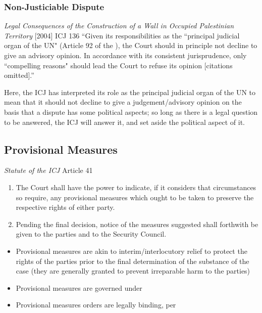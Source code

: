 \subsubsection{Non-Justiciable Dispute}
\begin{casedetails}{\textit{Legal Consequences of the Construction of a Wall in Occupied Palestinian Territory} [2004] ICJ 136}
    \flushleft
    ``Given its responsibilities as the ``principal judicial organ of the UN" (Article 92 of the ), the Court should in principle not decline to give an advisory opinion. In accordance with its consistent jurisprudence, only ``compelling reasons" should lead the Court to refuse its opinion [citations omitted].''

    \vspace{\baselineskip}

    Here, the ICJ has interpreted its role as the principal judicial organ of the UN to mean that it should not decline to give a judgement/advisory opinion on the basis that a dispute has some political aspects; so long as there is a legal question to be answered, the ICJ will answer it, and set aside the political aspect of it.
\end{casedetails}

\subsection{Provisional Measures}
\begin{statutedetails}{\textit{Statute of the ICJ} Article 41}
    \flushleft
    \begin{enumerate}
        \item The Court shall have the power to indicate, if it considers that circumstances so require, any provisional measures which ought to be taken to preserve the respective rights of either party.
        \item Pending the final decision, notice of the measures suggested shall forthwith be given to the parties and to the Security Council.
    \end{enumerate}
\end{statutedetails}

\begin{itemize}
    \item Provisional measures are akin to interim/interlocutory relief to protect the rights of the parties prior to the final determination of the substance of the case (they are generally granted to prevent irreparable harm to the parties)
    \item Provisional measures are governed under 
    \item Provisional measures orders are legally binding, per 
\end{itemize}

